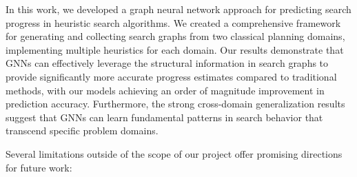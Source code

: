 \documentclass[letterpaper]{article}
\begin{document}
In this work, we developed a graph neural network approach for predicting search progress in heuristic search algorithms. We created a comprehensive framework for generating and collecting search graphs from two classical planning domains, implementing multiple heuristics for each domain. Our results demonstrate that GNNs can effectively leverage the structural information in search graphs to provide significantly more accurate progress estimates compared to traditional methods, with our models achieving an order of magnitude improvement in prediction accuracy. Furthermore, the strong cross-domain generalization results suggest that GNNs can learn fundamental patterns in search behavior that transcend specific problem domains.

Several limitations outside of the scope of our project offer promising directions for future work:
\end{document}
